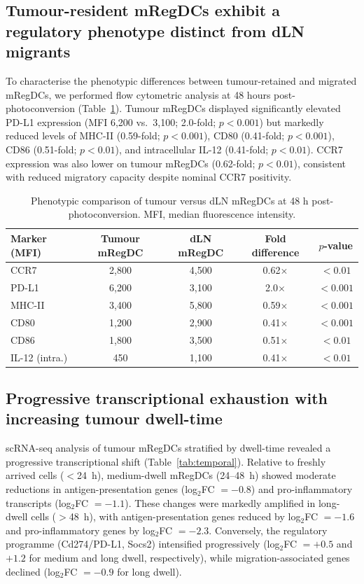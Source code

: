 \documentclass[11pt]{article}
\begin{document}
\subsection{Tumour-resident mRegDCs exhibit a regulatory phenotype distinct from dLN migrants}

To characterise the phenotypic differences between tumour-retained and migrated mRegDCs, we performed flow cytometric analysis at 48 hours post-photoconversion (Table~\ref{tab:phenotype}). Tumour mRegDCs displayed significantly elevated PD-L1 expression (MFI 6,200 vs.\ 3,100; 2.0-fold; $p < 0.001$) but markedly reduced levels of MHC-II (0.59-fold; $p < 0.001$), CD80 (0.41-fold; $p < 0.001$), CD86 (0.51-fold; $p < 0.01$), and intracellular IL-12 (0.41-fold; $p < 0.01$). CCR7 expression was also lower on tumour mRegDCs (0.62-fold; $p < 0.01$), consistent with reduced migratory capacity despite nominal CCR7 positivity.

\begin{table}[htbp]
\centering
\caption{Phenotypic comparison of tumour versus dLN mRegDCs at 48 h post-photoconversion. MFI, median fluorescence intensity.}
\label{tab:phenotype}
\begin{tabular}{@{}lcccc@{}}
\toprule
Marker (MFI) & Tumour mRegDC & dLN mRegDC & Fold difference & $p$-value \\
\midrule
CCR7           & 2,800 & 4,500 & 0.62$\times$ & $<0.01$  \\
PD-L1          & 6,200 & 3,100 & 2.0$\times$  & $<0.001$ \\
MHC-II         & 3,400 & 5,800 & 0.59$\times$ & $<0.001$ \\
CD80           & 1,200 & 2,900 & 0.41$\times$ & $<0.001$ \\
CD86           & 1,800 & 3,500 & 0.51$\times$ & $<0.01$  \\
IL-12 (intra.) & 450   & 1,100 & 0.41$\times$ & $<0.01$  \\
\bottomrule
\end{tabular}
\end{table}

\subsection{Progressive transcriptional exhaustion with increasing tumour dwell-time}

scRNA-seq analysis of tumour mRegDCs stratified by dwell-time revealed a progressive transcriptional shift (Table~\ref{tab:temporal}). Relative to freshly arrived cells ($<$24~h), medium-dwell mRegDCs (24--48~h) showed moderate reductions in antigen-presentation genes (log$_2$FC $= -0.8$) and pro-inflammatory transcripts (log$_2$FC $= -1.1$). These changes were markedly amplified in long-dwell cells ($>$48~h), with antigen-presentation genes reduced by log$_2$FC $= -1.6$ and pro-inflammatory genes by log$_2$FC $= -2.3$. Conversely, the regulatory programme (Cd274/PD-L1, Socs2) intensified progressively (log$_2$FC $= +0.5$ and $+1.2$ for medium and long dwell, respectively), while migration-associated genes declined (log$_2$FC $= -0.9$ for long dwell).
\end{document}
